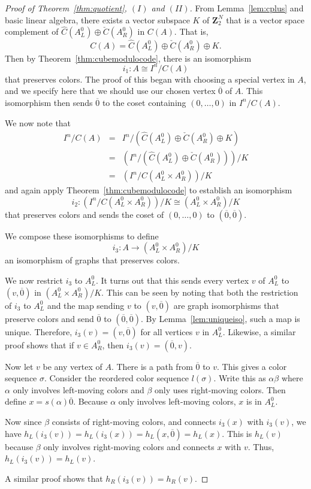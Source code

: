 \documentclass[12pt,twoside,singlespace]{article}
\numberwithin{equation}{section}
\theoremstyle{definition}
\newcommand{\ZZ}{\mathbf{Z}}
\begin{document}
\begin{proof}[Proof of Theorem~\ref{thm:quotient}, $(I)$ and $(II)$]
From Lemma~\ref{lem:cplus} and basic linear algebra, there exists a vector subspace $K$ of $\ZZ_2^N$ that is a vector space complement of
$\hat{C}(A_L^0)\oplus \check{C}(A_R^0)$ in $C(A)$.  That is,
\[C(A)=\hat{C}(A_L^0)\oplus \check{C}(A_R^0)\oplus K.\]
Then by Theorem~\ref{thm:cubemodulocode}, there is an isomorphism
\[i_1:A\cong I^n/C(A)\]
that preserves colors.  The proof of this began with choosing a special vertex in $A$, and we specify here that we should use our chosen vertex $\overline{0}$ of $A$.  This isomorphism then sends $\overline{0}$ to the coset containing $(0,\ldots,0)$ in $I^n/C(A)$.

We now note that
\begin{eqnarray*}
I^n/C(A)
&=&I^n/(\hat{C}(A_L^0)\oplus \check{C}(A_R^0)\oplus K)\\
&=&(I^n/(\hat{C}(A_L^0)\oplus \check{C}(A_R^0)))/ K\\
&=&(I^n/C(A_L^0 \times A_R^0))/ K
\end{eqnarray*}
and again apply Theorem~\ref{thm:cubemodulocode} to establish an isomorphism
\[i_2:(I^n/C(A_L^0 \times A_R^0))/ K\cong (A_L^0\times A_R^0)/K\]
that preserves colors and sends the coset of $(0,\ldots,0)$ to $(\overline{0},\overline{0})$.

We compose these isomorphisms to define
\[i_3:A\to (A_L^0\times A_R^0)/K\]
an isomorphism of graphs that preserves colors.

We now restrict $i_3$ to $A_L^0$.  It turns out that this sends every vertex $v$ of $A_L^0$ to $(v,\overline{0})$ in $(A_L^0\times A_R^0)/K$.  This can be seen by noting that both the restriction of $i_3$ to $A_L^0$ and the map sending $v$ to $(v,\overline{0})$ are graph isomorphisms that preserve colors and send $\overline{0}$ to $(\overline{0},\overline{0})$.  By Lemma~\ref{lem:uniqueiso}, such a map is unique.  Therefore, $i_3(v)=(v,\overline{0})$ for all vertices $v$ in $A_L^0$.  Likewise, a similar proof shows that if $v\in A_R^0$, then $i_3(v)=(\overline{0},v)$.

Now let $v$ be any vertex of $A$.  There is a path from $\overline{0}$ to $v$.  This gives a color sequence $\sigma$.  Consider the reordered color sequence $l(\sigma)$.  Write this as $\alpha\beta$ where $\alpha$ only involves left-moving colors and $\beta$ only uses right-moving colors.  Then define $x=s(\alpha)\overline{0}$.  Because $\alpha$ only involves left-moving colors, $x$ is in $A_L^0$.

Now since $\beta$ consists of right-moving colors, and connects $i_3(x)$ with $i_3(v)$, we have $h_L(i_3(v))=h_L(i_3(x))=h_L(x,\overline{0})=h_L(x)$.  This is $h_L(v)$ because $\beta$ only involves right-moving colors and connects $x$ with $v$.  Thus, $h_L(i_3(v))=h_L(v)$.

A similar proof shows that $h_R(i_3(v))=h_R(v)$.
\end{proof}
\end{document}
